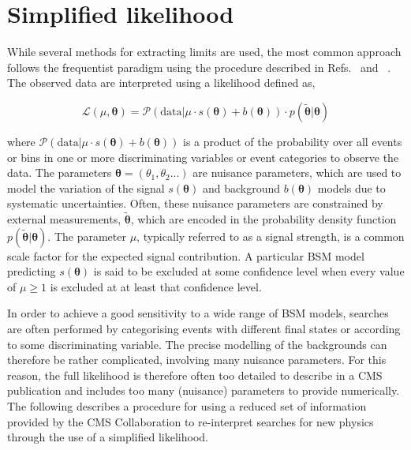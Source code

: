 \section{Simplified likelihood}
\label{sec:simplified-likelihood}

While several methods for extracting 
limits are used, the most common approach follows the frequentist paradigm using the procedure 
described in Refs.~\cite{Chatrchyan:2012tx} and ~\cite{CMS-NOTE-2011-005}. 
The observed data are interpreted using a likelihood defined as,

\begin{equation}
 \mathcal{L}(\mu, \boldsymbol{\theta}) = 
 \mathcal{P}(\mathrm{data}|\mu\cdot s(\boldsymbol{\theta}) + b(\boldsymbol{\theta})) \cdot p(\tilde{\boldsymbol{\theta}}|\boldsymbol{\theta})
\label{eq:generic-likelihood}
\end{equation}

where $\mathcal{P}(\mathrm{data}|\mu\cdot s(\boldsymbol{\theta}) + b(\boldsymbol{\theta}))$ is a product of the probability 
over all events or bins in one or more discriminating variables or event categories to observe the data. The parameters 
$\boldsymbol{\theta}=\left(\theta_{1},\theta_{2}...\right)$ are nuisance parameters, which are used to model the variation of the 
signal $s(\boldsymbol{\theta})$ and background $b(\boldsymbol{\theta})$ models due to systematic uncertainties. Often, these nuisance 
parameters are constrained by external measurements, $\tilde{\boldsymbol{\theta}}$, which are encoded in the 
probability density function $p(\tilde{\boldsymbol{\theta}}|\boldsymbol{\theta})$. 
The parameter $\mu$, typically referred to as a signal strength, is a common scale factor for the expected signal contribution. 
A particular BSM model predicting $s(\boldsymbol{\theta})$ is said to be excluded at some confidence level 
when every value of $\mu\ge1$ is excluded at at least that confidence level.

In order to achieve a good sensitivity to a wide range of BSM models, searches are often performed 
by categorising events with different final states or according to some discriminating variable. 
The precise modelling of the backgrounds can therefore be rather complicated, involving many 
nuisance parameters. For this reason, the full likelihood is therefore often 
too detailed to describe in a CMS publication and includes too many (nuisance) parameters to provide numerically. 
The following describes a procedure for using a reduced set of information provided by the CMS Collaboration to 
re-interpret searches for new physics through the use of a simplified likelihood. 


